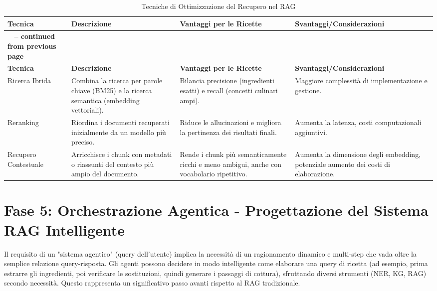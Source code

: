 \documentclass[a4paper, 11pt]{article}
\begin{document}
\begin{longtable}{>{\raggedright\arraybackslash}p{3cm} >{\raggedright\arraybackslash}p{4.5cm} >{\raggedright\arraybackslash}p{4.5cm} >{\raggedright\arraybackslash}p{4.5cm}}
\caption{Tecniche di Ottimizzazione del Recupero nel RAG}\\
\toprule
\textbf{Tecnica} & \textbf{Descrizione} & \textbf{Vantaggi per le Ricette} & \textbf{Svantaggi/Considerazioni} \\
\midrule
\endfirsthead
\multicolumn{4}{c}%
{{\bfseries \tablename\ \thetable{} -- continued from previous page}} \\
\toprule
\textbf{Tecnica} & \textbf{Descrizione} & \textbf{Vantaggi per le Ricette} & \textbf{Svantaggi/Considerazioni} \\
\midrule
\endhead
\bottomrule
\endfoot
Ricerca Ibrida \cite{hybrid_search_vectorchord} & Combina la ricerca per parole chiave (BM25) e la ricerca semantica (embedding vettoriali). & Bilancia precisione (ingredienti esatti) e recall (concetti culinari ampi). \cite{hybrid_search_vectorchord} & Maggiore complessità di implementazione e gestione. \cite{hybrid_search_vectorchord} \\
\addlinespace
Reranking \cite{mastering_rag_reranking} & Riordina i documenti recuperati inizialmente da un modello più preciso. & Riduce le allucinazioni e migliora la pertinenza dei risultati finali. \cite{mastering_rag_reranking} & Aumenta la latenza, costi computazionali aggiuntivi. \cite{reranking_mechanisms_medium} \\
\addlinespace
Recupero Contestuale \cite{contextual_retrieval_pluralsight} & Arricchisce i chunk con metadati o riassunti del contesto più ampio del documento. & Rende i chunk più semanticamente ricchi e meno ambigui, anche con vocabolario ripetitivo. \cite{contextual_retrieval_mlexpert} & Aumenta la dimensione degli embedding, potenziale aumento dei costi di elaborazione. \cite{contextual_retrieval_somawansa} \\
\end{longtable}

\section{Fase 5: Orchestrazione Agentica - Progettazione del Sistema RAG Intelligente}
Il requisito di un "sistema agentico" (query dell'utente) implica la necessità di un ragionamento dinamico e multi-step che vada oltre la semplice relazione query-risposta. Gli agenti possono decidere in modo intelligente come elaborare una query di ricetta (ad esempio, prima estrarre gli ingredienti, poi verificare le sostituzioni, quindi generare i passaggi di cottura), sfruttando diversi strumenti (NER, KG, RAG) secondo necessità. Questo rappresenta un significativo passo avanti rispetto al RAG tradizionale.
\end{document}
